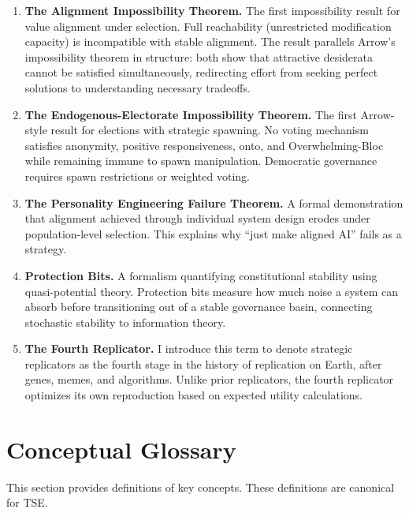 \documentclass[12pt]{article}
\begin{document}
\begin{enumerate}
\item \textbf{The Alignment Impossibility Theorem.} The first impossibility result for value alignment under selection. Full reachability (unrestricted modification capacity) is incompatible with stable alignment. The result parallels Arrow's impossibility theorem in structure: both show that attractive desiderata cannot be satisfied simultaneously, redirecting effort from seeking perfect solutions to understanding necessary tradeoffs.

\item \textbf{The Endogenous-Electorate Impossibility Theorem.} The first Arrow-style result for elections with strategic spawning. No voting mechanism satisfies anonymity, positive responsiveness, onto, and Overwhelming-Bloc while remaining immune to spawn manipulation. Democratic governance requires spawn restrictions or weighted voting.

\item \textbf{The Personality Engineering Failure Theorem.} A formal demonstration that alignment achieved through individual system design erodes under population-level selection. This explains why ``just make aligned AI'' fails as a strategy.

\item \textbf{Protection Bits.} A formalism quantifying constitutional stability using quasi-potential theory. Protection bits measure how much noise a system can absorb before transitioning out of a stable governance basin, connecting stochastic stability to information theory.

\item \textbf{The Fourth Replicator.} I introduce this term to denote strategic replicators as the fourth stage in the history of replication on Earth, after genes, memes, and algorithms. Unlike prior replicators, the fourth replicator optimizes its own reproduction based on expected utility calculations.
\end{enumerate}



\section{Conceptual Glossary}
\label{sec:glossary}

This section provides definitions of key concepts. These definitions are canonical for TSE.
\end{document}
